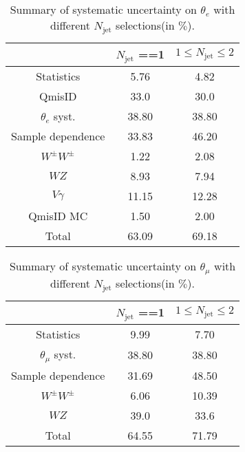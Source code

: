 \begin{table}[!ht]
\begin{center}
\begin{tabular}{c|c|c}
\hline
\hline
               &$N_\text{jet}$ ==1  &$1\leq N_{\text{jet}} \leq 2$ \\
\hline
Statistics         &5.76   &4.82   \\
QmisID             &33.0   &30.0   \\
$\theta_{e}$ syst.  &38.80   &38.80  \\
Sample dependence      &33.83   &46.20  \\
$W^{\pm}W^{\pm}$       &1.22    &2.08  \\
$WZ$                   &8.93    &7.94  \\
$V\gamma$              &11.15   &12.28      \\
QmisID MC              &1.50    &2.00      \\ 
\hline
Total                  &63.09   &69.18  \\
\hline
\hline
\end{tabular}
\caption{Summary of systematic uncertainty on $\theta_{e}$ with different $N_{\text{jet}}$ selections(in $\%$).}
\label{tab:syst_ff_ele}
\end{center}
\end{table}

\begin{table}[!ht]
\begin{center}
\begin{tabular}{c|c|c}
\hline
\hline
             &$N_\text{jet}$ ==1  &$1\leq N_{\text{jet}} \leq 2$ \\
\hline
Statistics         &9.99   &7.70   \\
$\theta_{\mu}$ syst.  &38.80   &38.80  \\
Sample dependence      &31.69   &48.50  \\
$W^{\pm}W^{\pm}$       &6.06    &10.39  \\
$WZ$                   &39.0    &33.6  \\
\hline
Total                  &64.55   &71.79  \\
\hline
\hline
\end{tabular}
\caption{Summary of systematic uncertainty on $\theta_{\mu}$ with different $N_{\text{jet}}$ selections(in $\%$).}
\label{tab:syst_ff_mu}
\end{center}
\end{table}
